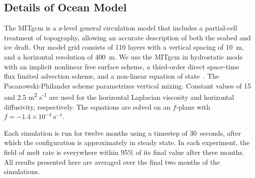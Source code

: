 \documentclass[draft]{agujournal2019}
\begin{document}
\subsection{Details of Ocean Model}\label{S:Experiment:Model}
The MITgcm is a z-level general circulation model that includes a partial-cell treatment of topography, allowing an accurate description of both the seabed and ice draft. Our model grid consists of 110 layers with a vertical spacing of 10~m, and a horizontal resolution of 400~m. We use the MITgcm in hydrostatic mode with an implicit nonlinear free surface scheme, a third-order direct space-time flux limited advection scheme, and a non-linear equation of state~\cite{Mcdougall2003JAtmosOceanTech}. The Pacanowski-Philander \cite{Pacanowski1981JPhysOcean} scheme parametrizes vertical mixing. Constant values of 15 and 2.5 
m\textsuperscript{2} s\textsuperscript{-1} are used for the horizontal Laplacian viscosity and horizontal diffusivity, respectively. The equations are solved on an $f$-plane with $f = -1.4\times10^{-4}~\text{s}^{-1}$.

Each simulation is run for twelve months using a timestep of 30~\si{seconds}, after which the configuration is approximately in steady state. In each experiment, the field of melt rate is everywhere within 95\% of its final value after three months. All results presented here are averaged over the final two months of the simulations.
\end{document}
